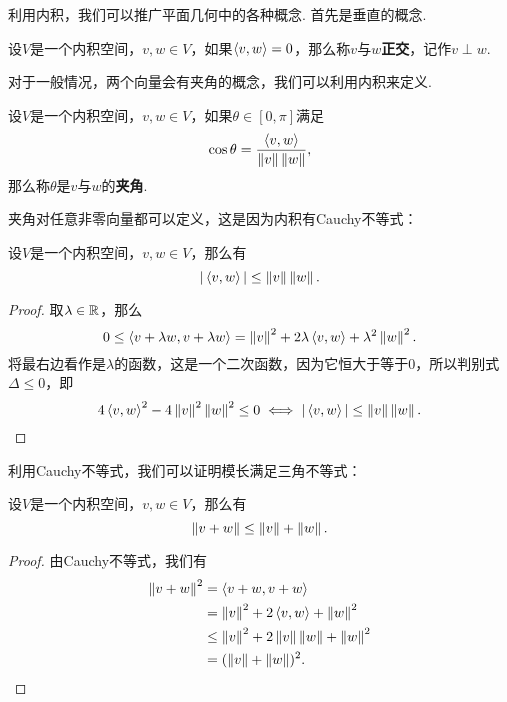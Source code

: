 利用内积，我们可以推广平面几何中的各种概念. 首先是垂直的概念. 

\begin{definition}[正交]
设$V$是一个内积空间，$v,w\in V$，如果$\left\langle{v},{w}\right\rangle=0$，那么称$v$与$w$\textbf{正交}，记作$v\perp w$.
\end{definition}

对于一般情况，两个向量会有夹角的概念，我们可以利用内积来定义. 

\begin{definition}[夹角]
设$V$是一个内积空间，$v,w\in V$，如果$\theta\in[0,\pi]$满足
\[
    \cos\theta=\frac{\left\langle{v},{w}\right\rangle}{\left\|v\right\|\left\|w\right\|},
\]
那么称$\theta$是$v$与$w$的\textbf{夹角}. 
\end{definition}

夹角对任意非零向量都可以定义，这是因为内积有Cauchy不等式：

\begin{theorem}[Cauchy不等式]\label{thm:cauchy}
设$V$是一个内积空间，$v,w\in V$，那么有
\[
    |\left\langle{v},{w}\right\rangle|\leq \left\|v\right\|\left\|w\right\|.
\]
\end{theorem}

\begin{proof}
    取$\lambda\in \mathbb{R}$，那么
    \[
        0\leq \left\langle{v+\lambda w},{v+\lambda w}\right\rangle=\left\|v\right\|^2+2\lambda\left\langle{v},{w}\right\rangle+\lambda^2\left\|w\right\|^2.
    \]
将最右边看作是$\lambda$的函数，这是一个二次函数，因为它恒大于等于$0$，所以判别式$\Delta\leq 0$，即
\[
    4\left\langle{v},{w}\right\rangle^2-4\left\|v\right\|^2\left\|w\right\|^2\leq 0\iff |\left\langle{v},{w}\right\rangle|\leq \left\|v\right\|\left\|w\right\|.
\]
\end{proof}

利用Cauchy不等式，我们可以证明模长满足三角不等式：
\begin{theorem}[三角不等式]\label{thm:triangle}
设$V$是一个内积空间，$v,w\in V$，那么有
\[
    \left\|v+w\right\|\leq \left\|v\right\|+\left\|w\right\|.
\]
\end{theorem}

\begin{proof}
由Cauchy不等式，我们有
\begin{align*}
    \left\|v+w\right\|^2 &= \left\langle{v+w},{v+w}\right\rangle \\
    &= \left\|v\right\|^2+2\left\langle{v},{w}\right\rangle+\left\|w\right\|^2 \\
    &\leq \left\|v\right\|^2+2\left\|v\right\|\left\|w\right\|+\left\|w\right\|^2 \\
    &= (\left\|v\right\|+\left\|w\right\|)^2.
\end{align*}
\end{proof}

